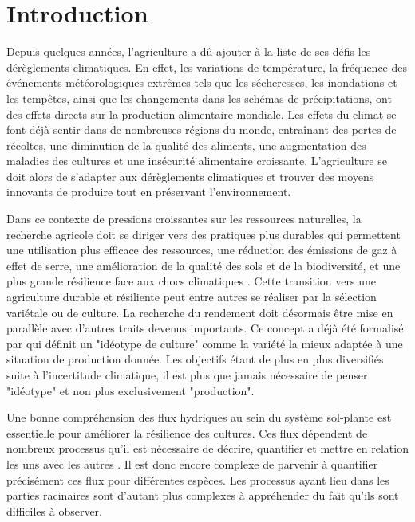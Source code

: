 \section*{Introduction}

Depuis quelques années, l’agriculture a dû ajouter à la liste de ses défis les dérèglements climatiques.
En effet, les variations de température, la fréquence des événements météorologiques extrêmes tels que les sécheresses, les inondations et les tempêtes, ainsi que les changements dans les schémas de précipitations, ont des effets directs sur la production alimentaire mondiale.
Les effets du climat se font déjà sentir dans de nombreuses régions du monde, entraînant des pertes de récoltes, une diminution de la qualité des aliments, une augmentation des maladies des cultures et une insécurité alimentaire croissante.
L’agriculture se doit alors de s’adapter aux dérèglements climatiques et trouver des moyens innovants de produire tout en préservant l’environnement. 
\newline

Dans ce contexte de pressions croissantes sur les ressources naturelles, la recherche agricole doit se diriger vers des pratiques plus durables qui permettent une utilisation plus efficace des ressources, une réduction des émissions de gaz à effet de serre, une amélioration de la qualité des sols et de la biodiversité, et une plus grande résilience face aux chocs climatiques \citep{oecd_building_2021}.
Cette transition vers une agriculture durable et résiliente peut entre autres se réaliser par la sélection variétale ou de culture.
La recherche du rendement doit désormais être mise en parallèle avec d'autres traits devenus importants.
Ce concept a déjà été formalisé par \cite{donald_breeding_1968} qui définit un "idéotype de culture" comme la variété la mieux adaptée à une situation de production donnée.
Les objectifs étant de plus en plus diversifiés suite à l'incertitude climatique, il est plus que jamais nécessaire de penser "idéotype" et non plus exclusivement "production".
\newline

Une bonne compréhension des flux hydriques au sein du système sol-plante est essentielle pour améliorer la résilience des cultures. Ces flux dépendent de nombreux processus qu'il est nécessaire de décrire, quantifier et mettre en relation les uns avec les autres \citep{lobet_plant_2014}. 
Il est donc encore complexe de parvenir à quantifier précisément ces flux pour différentes espèces. Les processus ayant lieu dans les parties racinaires sont d'autant plus complexes à appréhender du fait qu'ils sont difficiles à observer. 
\newline
 
